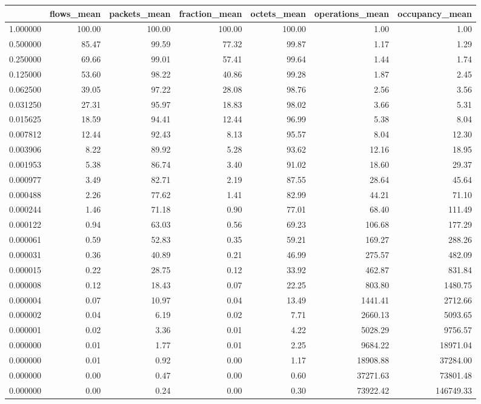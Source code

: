 \begin{tabular}{lrrrrrr}
\toprule
 & flows_mean & packets_mean & fraction_mean & octets_mean & operations_mean & occupancy_mean \\
\midrule
1.000000 & 100.00 & 100.00 & 100.00 & 100.00 & 1.00 & 1.00 \\
0.500000 & 85.47 & 99.59 & 77.32 & 99.87 & 1.17 & 1.29 \\
0.250000 & 69.66 & 99.01 & 57.41 & 99.64 & 1.44 & 1.74 \\
0.125000 & 53.60 & 98.22 & 40.86 & 99.28 & 1.87 & 2.45 \\
0.062500 & 39.05 & 97.22 & 28.08 & 98.76 & 2.56 & 3.56 \\
0.031250 & 27.31 & 95.97 & 18.83 & 98.02 & 3.66 & 5.31 \\
0.015625 & 18.59 & 94.41 & 12.44 & 96.99 & 5.38 & 8.04 \\
0.007812 & 12.44 & 92.43 & 8.13 & 95.57 & 8.04 & 12.30 \\
0.003906 & 8.22 & 89.92 & 5.28 & 93.62 & 12.16 & 18.95 \\
0.001953 & 5.38 & 86.74 & 3.40 & 91.02 & 18.60 & 29.37 \\
0.000977 & 3.49 & 82.71 & 2.19 & 87.55 & 28.64 & 45.64 \\
0.000488 & 2.26 & 77.62 & 1.41 & 82.99 & 44.21 & 71.10 \\
0.000244 & 1.46 & 71.18 & 0.90 & 77.01 & 68.40 & 111.49 \\
0.000122 & 0.94 & 63.03 & 0.56 & 69.23 & 106.68 & 177.29 \\
0.000061 & 0.59 & 52.83 & 0.35 & 59.21 & 169.27 & 288.26 \\
0.000031 & 0.36 & 40.89 & 0.21 & 46.99 & 275.57 & 482.09 \\
0.000015 & 0.22 & 28.75 & 0.12 & 33.92 & 462.87 & 831.84 \\
0.000008 & 0.12 & 18.43 & 0.07 & 22.25 & 803.80 & 1480.75 \\
0.000004 & 0.07 & 10.97 & 0.04 & 13.49 & 1441.41 & 2712.66 \\
0.000002 & 0.04 & 6.19 & 0.02 & 7.71 & 2660.13 & 5093.65 \\
0.000001 & 0.02 & 3.36 & 0.01 & 4.22 & 5028.29 & 9756.57 \\
0.000000 & 0.01 & 1.77 & 0.01 & 2.25 & 9684.22 & 18971.04 \\
0.000000 & 0.01 & 0.92 & 0.00 & 1.17 & 18908.88 & 37284.00 \\
0.000000 & 0.00 & 0.47 & 0.00 & 0.60 & 37271.63 & 73801.48 \\
0.000000 & 0.00 & 0.24 & 0.00 & 0.30 & 73922.42 & 146749.33 \\
\bottomrule
\end{tabular}
